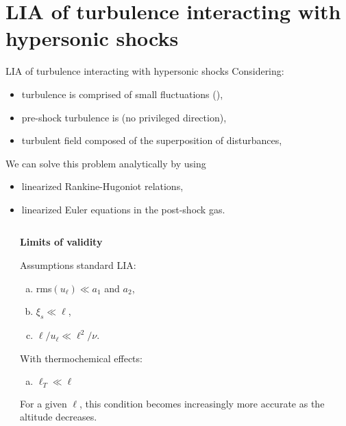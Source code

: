 \documentclass[9pt, aspectratio=1609]{beamer}
\newcommand{\acl}[1]{{\color{cardinalred}{#1}}}
\begin{document}
\section{LIA of turbulence interacting with hypersonic shocks}
\begin{frame}[t]{\large LIA of turbulence interacting with hypersonic shocks}
Considering:
\begin{itemize}
    \item turbulence is comprised of small fluctuations (\acl{weak}),
    \item pre-shock turbulence is \acl{isotropic} (no privileged direction),
    \item turbulent field composed of the superposition of \acl{vortical} disturbances,
\end{itemize}
We can solve this problem analytically by using  
\begin{itemize}
    \item linearized Rankine-Hugoniot relations,
    \item linearized Euler equations in the post-shock gas.
\end{itemize}
\setlength{\leftmargini}{2em}

\vspace{-1cm}
\begin{columns}[c]
    \begin{column}{.5\textwidth}%
    \end{column}%
    \begin{column}{.35\textwidth}

    \textbf{Limits of validity}

    \vspace{0.1cm}
    
    Assumptions standard LIA:
    \begin{enumerate}[(a)]
        \item rms$(u_\ell) \ll a_1$ and $a_2$,
        \item $\xi_s \ll \ell$,
        \item $ \ell/ u_\ell\ll \ell^2/\nu$.
    \end{enumerate}
    
    With thermochemical effects:
    \begin{enumerate}[(d)]
         \item $\ell_T\ll \ell$
    \end{enumerate}
    For a given $\ell$, this condition becomes increasingly more accurate as the  altitude decreases.
    
    \end{column}%
\end{columns}


\end{frame}
\end{document}
